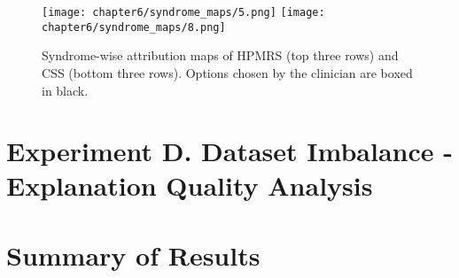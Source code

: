 \documentclass[../report.tex]{subfiles}
\begin{document}
            \begin{sidewaysfigure}
    	\texttt{[image: chapter6/syndrome\_maps/5.png]}
    	    	\texttt{[image: chapter6/syndrome\_maps/8.png]}
    	
    	\caption[Syndrome-wise attribution maps of HPMRS and CSS]{Syndrome-wise attribution maps of HPMRS (top three rows) and CSS (bottom three rows). Options chosen by the clinician are boxed in black.}
    	\label{fig_synd_map_2}	
    \end{sidewaysfigure}
    \clearpage
	\section{Experiment D. Dataset Imbalance - Explanation Quality Analysis}
	
	\section{Summary of Results}
	
\end{document}

